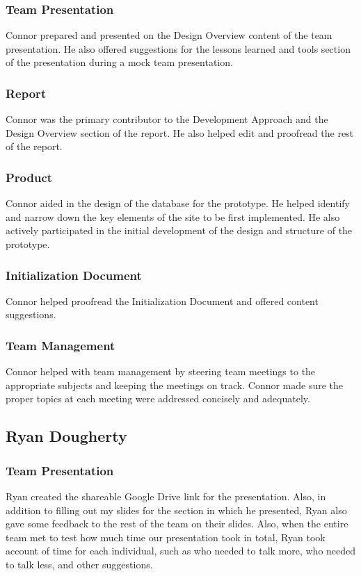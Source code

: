 \documentclass[12pt]{article}
\begin{document}
\begin{spacing}{1.5}
\subsubsection{Team Presentation}
Connor prepared  and presented on the Design Overview content of the team presentation. He also offered suggestions for the lessons learned and tools section of the presentation during a mock team presentation. 
\subsubsection{Report}
Connor was the primary contributor to the Development Approach and the Design Overview section of the report. He also helped edit and proofread the rest of the report.
\subsubsection{Product}
Connor aided in the design of the database for the prototype. He helped identify and narrow down the key elements of the site to be first implemented. He also actively participated in the initial development of the design and structure of the prototype.
\subsubsection{Initialization Document}
Connor helped proofread the Initialization Document and offered content suggestions. 
\subsubsection{Team Management}
Connor helped with team management by steering team meetings to the appropriate subjects and keeping the meetings on track. Connor made sure the proper topics at each meeting were addressed concisely and adequately.

\clearpage

\subsection{Ryan Dougherty}
\subsubsection{Team Presentation}
Ryan created the shareable Google Drive link for the presentation. Also, in addition to filling out my slides for the section in which he presented, Ryan also gave some feedback to the rest of the team on their slides. Also, when the entire team met to test how much time our presentation took in total, Ryan took account of time for each individual, such as who needed to talk more, who needed to talk less, and other suggestions.

\end{spacing}
\end{document}
